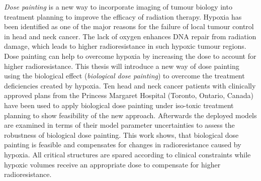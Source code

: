 
\textit{Dose painting} is a new way to incorporate imaging of tumour biology into treatment planning to improve the efficacy of radiation therapy.  Hypoxia has been identified as one of the major reasons for the failure of local tumour control in head and neck cancer. The lack of oxygen enhances DNA repair from radiation damage, which leads to higher radioresistance in such hypoxic tumour regions. Dose painting can help to overcome hypoxia by increasing the dose to account for higher radioresistance. This thesis will introduce a new way of dose painting using the biological effect (\textit{biological dose painting}) to overcome the treatment deficiencies created by hypoxia. Ten head and neck cancer patients with clinically approved plans from the Princess Margaret Hospital (Toronto, Ontario, Canada) have been used to apply biological dose painting under iso-toxic treatment planning to show feasibility of the new approach. Afterwards the deployed models are examined in terms of their model parameter uncertainties to assess the robustness of biological dose painting. This work shows, that biological dose painting is feasible and compensates for changes in radioresistance caused by hypoxia. All critical structures are spared according to clinical constraints while hypoxic volumes receive an appropriate dose to compensate for higher radioresistance.